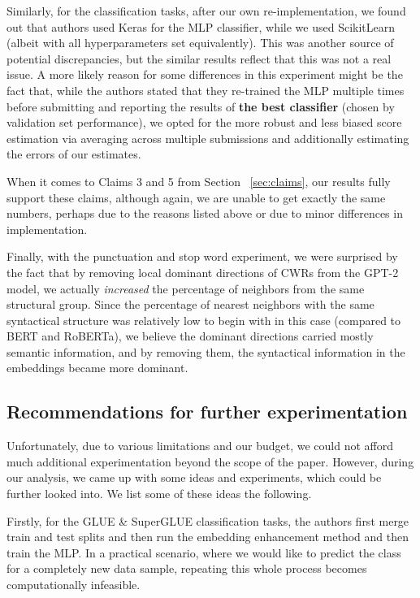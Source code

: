 Similarly, for the classification tasks, after our own re-implementation, we found out that authors used Keras for the MLP classifier, while we used ScikitLearn (albeit with all hyperparameters set equivalently). This was another source of potential discrepancies, but the similar results reflect that this was not a real issue. A more likely reason for some differences in this experiment might be the fact that, while the authors stated that they re-trained the MLP multiple times before submitting and reporting the results of \textbf{the best classifier} (chosen by validation set performance), we opted for the more robust and less biased score estimation via averaging across multiple submissions and additionally estimating the errors of our estimates. 

When it comes to Claims 3 and 5 from Section ~\ref{sec:claims}, our results fully support these claims, although again, we are unable to get exactly the same numbers, perhaps due to the reasons listed above or due to minor differences in implementation. 

Finally, with the punctuation and stop word experiment, we were surprised by the fact that by removing local dominant directions of CWRs from the GPT-2 model, we actually \textit{increased} the percentage of neighbors from the same structural group. Since the percentage of nearest neighbors with the same syntactical structure was relatively low to begin with in this case (compared to BERT and RoBERTa), we believe the dominant directions carried mostly semantic information, and by removing them, the syntactical information in the embeddings became more dominant.

\subsection{Recommendations for further experimentation}

Unfortunately, due to various limitations and our budget, we could not afford much additional experimentation beyond the scope of the paper. However, during our analysis, we came up with some ideas and experiments, which could be further looked into. We list some of these ideas the following. 

Firstly, for the GLUE \& SuperGLUE classification tasks, the authors first merge train and test splits and then run the embedding enhancement method and then train the MLP. In a practical scenario, where we would like to predict the class for a completely new data sample, repeating this whole process becomes computationally infeasible.

